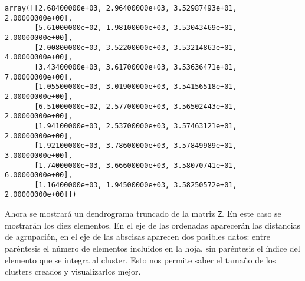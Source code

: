 \documentclass[12pt,a4paper,table]{article}
\makeatletter
\newcommand{\boxspacing}{\kern\kvtcb@left@rule\kern\kvtcb@boxsep}
\newcommand{\prompt}[4]{
        {\ttfamily\llap{{\color{#2}[#3]:\hspace{3pt}#4}}\vspace{-\baselineskip}}
    }
\makeatother
\begin{document}
            \begin{tcolorbox}[breakable, size=fbox, boxrule=.5pt, pad at break*=1mm, opacityfill=0]
\prompt{Out}{outcolor}{15}{\boxspacing}
\begin{Verbatim}[commandchars=\\\{\}]
array([[2.68400000e+03, 2.96400000e+03, 3.52987493e+01, 2.00000000e+00],
       [5.61000000e+02, 1.98100000e+03, 3.53043469e+01, 2.00000000e+00],
       [2.00800000e+03, 3.52200000e+03, 3.53214863e+01, 4.00000000e+00],
       [3.43400000e+03, 3.61700000e+03, 3.53636471e+01, 7.00000000e+00],
       [1.05500000e+03, 3.01900000e+03, 3.54156518e+01, 2.00000000e+00],
       [6.51000000e+02, 2.57700000e+03, 3.56502443e+01, 2.00000000e+00],
       [1.94100000e+03, 2.53700000e+03, 3.57463121e+01, 2.00000000e+00],
       [1.92100000e+03, 3.78600000e+03, 3.57849989e+01, 3.00000000e+00],
       [1.74000000e+03, 3.66600000e+03, 3.58070741e+01, 6.00000000e+00],
       [1.16400000e+03, 1.94500000e+03, 3.58250572e+01, 2.00000000e+00]])
\end{Verbatim}
\end{tcolorbox}
        
    Ahora se mostrará un dendrograma truncado de la matriz \texttt{Z}. En
este caso se mostrarán los diez elementos. En el eje de las ordenadas
aparecerán las distancias de agrupación, en el eje de las abscisas
aparecen dos posibles datos: entre paréntesis el número de elementos
incluidos en la hoja, sin paréntesis el índice del elemento que se
integra al cluster. Esto nos permite saber el tamaño de los clusters
creados y visualizarlos mejor.
\end{document}
